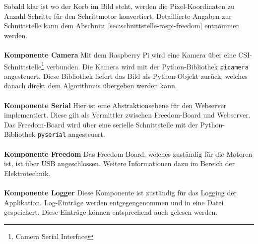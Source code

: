 Sobald klar ist wo der Korb im Bild steht, werden die Pixel-Koordinaten zu Anzahl Schritte für den Schrittmotor konvertiert. Detaillierte Angaben zur Schnittstelle kann dem Abschnitt \ref{sec:schnittstelle-raspi-freedom} entnommen werden.
\\
\\
\textbf{Komponente Camera}
Mit dem Raspberry Pi wird eine Kamera über eine CSI-Schnittstelle\footnote{Camera Serial Interface} verbunden.  Die Kamera wird mit der Python-Bibliothek \texttt{picamera} angesteuert. Diese Bibliothek liefert das Bild als Python-Objekt zurück, welches danach direkt dem Algorithmus übergeben werden kann.
\\
\\
\textbf{Komponente Serial}
Hier ist eine Abstraktionsebene für den Webserver implementiert. Diese gilt als Vermittler zwischen Freedom-Board und Webserver. Das Freedom-Board wird über eine serielle Schnittstelle mit der Python-Bibliothek \texttt{pyserial} angesteuert.
\\
\\
\textbf{Komponente Freedom}
Das Freedom-Board, welches zuständig für die Motoren ist, ist über USB angeschlossen. Weitere Informationen dazu im Bereich der Elektrotechnik.
\\
\\
\textbf{Komponente Logger}
Diese Komponente ist zuständig für das Logging der Applikation. Log-Einträge werden entgegengenommen und in eine Datei gespeichert. Diese Einträge können entsprechend auch gelesen werden.
